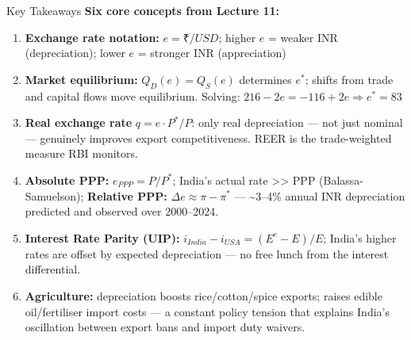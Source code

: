 \documentclass[
  ignorenonframetext,
  aspectratio=169,
]{beamer}
\makeatletter
\let\quarto@originallabel\label
\DeclareRobustCommand*{\label}[1]{\quarto@originallabel{#1}}
\makeatother
\begin{document}
\begin{frame}{Key Takeaways}
\label{key-takeaways}
\textbf{Six core concepts from Lecture 11:}

\begin{enumerate}
\item
  \textbf{Exchange rate notation:} \(e = ₹/USD\); higher \(e\) = weaker
  INR (depreciation); lower \(e\) = stronger INR (appreciation)
\item
  \textbf{Market equilibrium:} \(Q_D(e) = Q_S(e)\) determines \(e^*\);
  shifts from trade and capital flows move equilibrium. Solving:
  \(216-2e = -116+2e \Rightarrow e^* = 83\)
\item
  \textbf{Real exchange rate} \(q = e \cdot P^*/P\): only real
  depreciation --- not just nominal --- genuinely improves export
  competitiveness. REER is the trade-weighted measure RBI monitors.
\item
  \textbf{Absolute PPP:} \(e_{PPP} = P/P^*\); India's actual rate
  \textgreater\textgreater{} PPP (Balassa-Samuelson); \textbf{Relative
  PPP:} \(\Delta e \approx \pi - \pi^*\) --- \textasciitilde3--4\%
  annual INR depreciation predicted and observed over 2000--2024.
\item
  \textbf{Interest Rate Parity (UIP):}
  \(i_{India} - i_{USA} = (E^e - E)/E\); India's higher rates are offset
  by expected depreciation --- no free lunch from the interest
  differential.
\item
  \textbf{Agriculture:} depreciation boosts rice/cotton/spice exports;
  raises edible oil/fertiliser import costs --- a constant policy
  tension that explains India's oscillation between export bans and
  import duty waivers.
\end{enumerate}
\end{frame}
\end{document}
